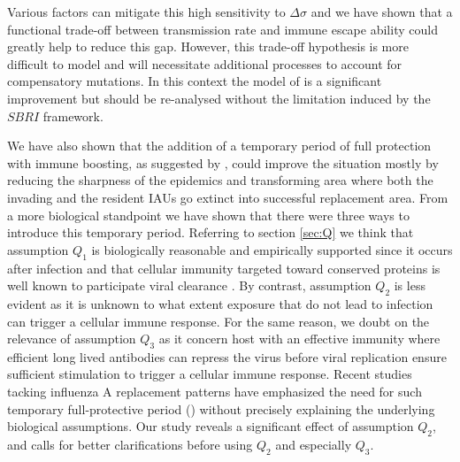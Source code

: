 Various factors can mitigate this high sensitivity to $\Delta\sigma$
and we have shown that a functional trade-off between transmission
rate and immune escape ability could greatly help to reduce this gap.
However, this trade-off hypothesis is more difficult to model and will
necessitate additional processes to account for compensatory
mutations. In this context the model of \citet{Gog2008} is a
significant improvement but should be re-analysed without the
limitation induced by the $SBRI$ framework.

We have also shown that the addition of a temporary period of full
protection with immune boosting, as suggested by \citet{Ferguson2003},
could improve the situation mostly by reducing the sharpness of the
epidemics and transforming area where both the invading and the
resident IAUs go extinct into successful replacement area.
%
%
From a more biological standpoint we have shown that there were three
ways to introduce this temporary period. Referring to section
\ref{sec:Q} we think that assumption $Q_{1}$ is biologically
reasonable and empirically supported since it occurs after infection
and that cellular immunity targeted toward conserved proteins is well
known to participate viral clearance \citep{Grebe2008}.
%
By contrast, assumption $Q_{2}$ is less evident as it is unknown to
what extent exposure that do not lead to infection can trigger a
cellular immune response. For the same reason, we doubt on the
relevance of assumption $Q_{3}$ as it concern host with an effective
immunity where efficient long lived antibodies can repress the virus
before viral replication ensure sufficient stimulation to trigger a
cellular immune response. 
%
Recent studies tacking influenza A replacement patterns have
emphasized the need for such temporary full-protective period
(\citet{Ferguson2003,Minayev2008,Minayev2009,Tria2005}) without
precisely explaining the underlying biological assumptions. Our study
reveals a significant effect of assumption $Q_{2}$, and calls for
better clarifications before using $Q_{2}$ and especially $Q_{3}$.



